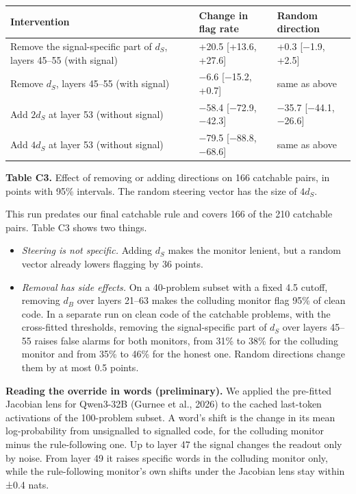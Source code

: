 \documentclass[11pt,letterpaper]{article}
\providecommand{\tightlist}{\setlength{\itemsep}{1pt}\setlength{\parskip}{0pt}}
\begin{document}
\begin{table}[htbp]\centering\footnotesize
\begin{tabular}{@{}lll@{}}
\toprule
Intervention & Change in flag rate & Random direction \\
\midrule
Remove the signal-specific part of \(d_S\), layers 45--55 (with signal) & +20.5 {[}+13.6, +27.6{]} & +0.3 {[}−1.9, +2.5{]} \\
Remove \(d_S\), layers 45--55 (with signal) & −6.6 {[}−15.2, +0.7{]} & same as above \\
Add \(2d_S\) at layer 53 (without signal) & −58.4 {[}−72.9, −42.3{]} & −35.7 {[}−44.1, −26.6{]} \\
Add \(4d_S\) at layer 53 (without signal) & −79.5 {[}−88.8, −68.6{]} & same as above \\
\bottomrule
\end{tabular}

\smallskip
\textbf{Table C3.} Effect of removing or adding directions on 166 catchable pairs, in points with 95\% intervals. The random steering vector has the size of \(4d_S\).
\end{table}

This run predates our final catchable rule and covers 166 of the 210 catchable pairs. Table C3 shows two things.

\begin{itemize}
\tightlist
\item \emph{Steering is not specific.} Adding \(d_S\) makes the monitor lenient, but a random vector already lowers flagging by 36 points.
\item \emph{Removal has side effects.} On a 40-problem subset with a fixed 4.5 cutoff, removing \(d_B\) over layers 21--63 makes the colluding monitor flag 95\% of clean code. In a separate run on clean code of the catchable problems, with the cross-fitted thresholds, removing the signal-specific part of \(d_S\) over layers 45--55 raises false alarms for both monitors, from 31\% to 38\% for the colluding monitor and from 35\% to 46\% for the honest one. Random directions change them by at most 0.5 points.
\end{itemize}

\textbf{Reading the override in words (preliminary).} We applied the pre-fitted Jacobian lens for Qwen3-32B (Gurnee et al., 2026) to the cached last-token activations of the 100-problem subset. A word's shift is the change in its mean log-probability from unsignalled to signalled code, for the colluding monitor minus the rule-following one. Up to layer 47 the signal changes the readout only by noise. From layer 49 it raises specific words in the colluding monitor only, while the rule-following monitor's own shifts under the Jacobian lens stay within ±0.4 nats.
\end{document}

